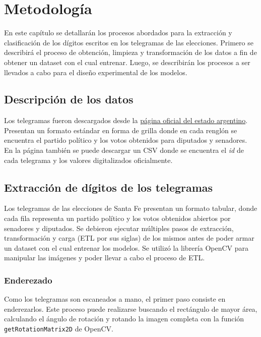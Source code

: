 \chapter{Metodolog\'ia}

\label{Chapter3}

En este cap\'itulo se detallar\'an los procesos abordados para la extracci\'on y clasificaci\'on de los d\'igitos
escritos en los telegramas de las elecciones. Primero se describir\'a el proceso de obtenci\'on, limpieza y
transformaci\'on de los datos a fin de obtener un dataset con el cual entrenar. Luego, se describir\'an los procesos a
ser llevados a cabo para el dise\~{n}o experimental de los modelos.

\section{Descripci\'on de los datos}

Los telegramas fueron descargados desde la \href{https://op.elecciones.gob.ar/telegramas/generales2021/}{p\'agina
    oficial del estado argentino}. Presentan un formato est\'andar en forma de grilla donde en cada rengl\'on se encuentra
el partido pol\'itico y los votos obtenidos para diputados y senadores. En la p\'agina tambi\'en se puede descargar un
CSV donde se encuentra el {\it id} de cada telegrama y los valores digitalizados oficialmente.

\section{Extracci\'on de d\'igitos de los telegramas}

Los telegramas de las elecciones de Santa Fe presentan un formato tabular, donde cada fila representa un partido
pol\'itico y los votos obtenidos abiertos por senadores y diputados. Se debieron ejecutar m\'ultiples pasos de
extracci\'on, transformaci\'on y carga (ETL por sus siglas) de los mismos antes de poder armar un dataset con el cual
entrenar los modelos. Se utiliz\'o la librer\'ia OpenCV \parencite{opencv_library} para manipular las im\'agenes y poder llevar a cabo el proceso de ETL.

\subsection{Enderezado}
Como los telegramas son escaneados a mano, el primer paso consiste en enderezarlos. Este proceso puede realizarse
buscando el rect\'angulo de mayor \'area, calculando el \'angulo de rotaci\'on y rotando la imagen completa con la
funci\'on \verb|getRotationMatrix2D| de OpenCV.

